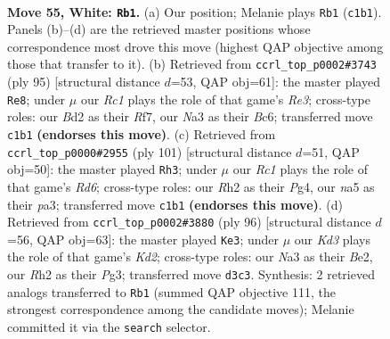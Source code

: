 \documentclass[11pt]{article}
\begin{document}
\clearpage

\begin{figure}[p]\centering
\begin{subfigure}{0.46\textwidth}\centering
\resizebox{\linewidth}{!}{%
\newchessgame
\chessboard[
  setfen={7r/p1r5/1p2p1kp/n7/2P1P3/N2K4/P2B2PR/2R5 w - - 3 55},
  showmover=false,
  pgfstyle=straightmove, color=movearrow, markmove={c1-b1}
]}
\caption{}
\end{subfigure}\hfill
\begin{subfigure}{0.46\textwidth}\centering
\resizebox{\linewidth}{!}{%
\newchessgame
\chessboard[
  setfen={8/5r2/2b1r1pB/1p6/1kn1p1PN/5PK1/2P1R3/3R4 b - - 1 48},
  showmover=false,
  pgfstyle=straightmove, color=movearrow, markmove={e6-e8}
]}
\caption{}
\end{subfigure}
\\[4pt]
\begin{subfigure}{0.46\textwidth}\centering
\resizebox{\linewidth}{!}{%
\newchessgame
\chessboard[
  setfen={8/5R2/4p3/1pb1k2P/p5p1/Pn1r4/3p1PK1/1N1R4 b - - 1 51},
  showmover=false,
  pgfstyle=straightmove, color=movearrow, markmove={d3-h3}
]}
\caption{}
\end{subfigure}\hfill
\begin{subfigure}{0.46\textwidth}\centering
\resizebox{\linewidth}{!}{%
\newchessgame
\chessboard[
  setfen={8/5p1p/5kp1/1pnr4/1R5P/3P2P1/3KBP2/8 w - - 16 49},
  showmover=false,
  pgfstyle=straightmove, color=movearrow, markmove={d2-e3}
]}
\caption{}
\end{subfigure}
\caption{\textbf{Move 55, White: \texttt{Rb1}.} (a) Our position; Melanie plays \texttt{Rb1} (\texttt{c1b1}). Panels (b)--(d) are the retrieved master positions whose correspondence most drove this move (highest QAP objective among those that transfer to it). (b) Retrieved from \texttt{ccrl\_top\_p0002\#3743} (ply 95) [structural distance $d$=53, QAP obj=61]: the master played \texttt{Re8}; under $\mu$ our \emph{Rc1} plays the role of that game's \emph{Re3}; cross-type roles: our \emph{B}d2 as their \emph{R}f7, our \emph{N}a3 as their \emph{B}c6; transferred move \texttt{c1b1} \textbf{(endorses this move)}. (c) Retrieved from \texttt{ccrl\_top\_p0000\#2955} (ply 101) [structural distance $d$=51, QAP obj=50]: the master played \texttt{Rh3}; under $\mu$ our \emph{Rc1} plays the role of that game's \emph{Rd6}; cross-type roles: our \emph{R}h2 as their \emph{P}g4, our \emph{n}a5 as their \emph{p}a3; transferred move \texttt{c1b1} \textbf{(endorses this move)}. (d) Retrieved from \texttt{ccrl\_top\_p0002\#3880} (ply 96) [structural distance $d$=56, QAP obj=63]: the master played \texttt{Ke3}; under $\mu$ our \emph{Kd3} plays the role of that game's \emph{Kd2}; cross-type roles: our \emph{N}a3 as their \emph{B}e2, our \emph{R}h2 as their \emph{P}g3; transferred move \texttt{d3c3}. Synthesis: 2 retrieved analogs transferred to \texttt{Rb1} (summed QAP objective 111, the strongest correspondence among the candidate moves); Melanie committed it via the \texttt{search} selector.}
\label{fig:thought-m108}
\end{figure}
\end{document}
